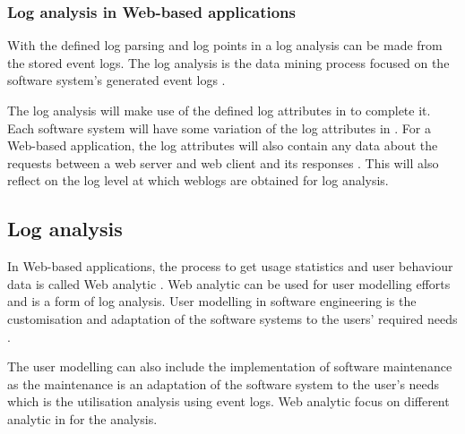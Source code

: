 \subsubsection{Log analysis in Web-based applications}
With the defined log parsing and log points in  a log analysis can be made from the stored event logs. The log analysis is the data mining process focused on the software system's generated event logs \cite{Slaninova2014,Hasiloglu2018}.\par The log analysis will make use of the defined log attributes in  to complete it. Each software system will have some variation of the log attributes in . For a Web-based application, the log attributes will also contain any data about the requests between a web server and web client and its responses \cite{Slaninova2014, Dhanalakshmi2016}. This will also reflect on the log level at which weblogs are obtained for log analysis.


\subsection{Log analysis}\label{sec:ch1_systemUtilisation}
In Web-based applications, the process to get usage statistics and user behaviour data is called Web analytic \cite{Kocsis2012}. Web analytic can be used for user modelling efforts and is a form of log analysis. User modelling in software engineering is the customisation and adaptation of the software systems to the users' required needs \cite{Waqar2017, Paliouras1999}.\par The user modelling can also include the implementation of software maintenance as the maintenance is an adaptation of the software system to the user's needs which is the utilisation analysis using event logs. Web analytic focus on different analytic in  for the analysis. 

